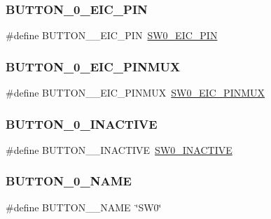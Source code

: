 \subsubsection{\texorpdfstring{BUTTON\_0\_EIC\_PIN}{BUTTON\_0\_EIC\_PIN}}
{\footnotesize\ttfamily \#define B\+U\+T\+T\+O\+N\+\_\+\_\+\+E\+I\+C\+\_\+\+P\+IN~\mbox{\hyperlink{group__samd21__xplained__pro__features__group_gac9d5ae203ecf805717134dfcee12372b}{S\+W0\+\_\+\+E\+I\+C\+\_\+\+P\+IN}}}

\mbox{\label{group__samd21__xplained__pro__features__group_gaca27ba0c8056196203f06d40cdeb7854}} 
\subsubsection{\texorpdfstring{BUTTON\_0\_EIC\_PINMUX}{BUTTON\_0\_EIC\_PINMUX}}
{\footnotesize\ttfamily \#define B\+U\+T\+T\+O\+N\+\_\+\_\+\+E\+I\+C\+\_\+\+P\+I\+N\+M\+UX~\mbox{\hyperlink{group__samd21__xplained__pro__features__group_ga27bc87cdd4caabcd3160ae3a03f297c7}{S\+W0\+\_\+\+E\+I\+C\+\_\+\+P\+I\+N\+M\+UX}}}

\mbox{\label{group__samd21__xplained__pro__features__group_ga54119bf75db09e383bfd9c3571fc4efe}} 
\subsubsection{\texorpdfstring{BUTTON\_0\_INACTIVE}{BUTTON\_0\_INACTIVE}}
{\footnotesize\ttfamily \#define B\+U\+T\+T\+O\+N\+\_\+\_\+\+I\+N\+A\+C\+T\+I\+VE~\mbox{\hyperlink{group__samd21__xplained__pro__features__group_ga74eeefc6abe579addaec6ac2bff4d080}{S\+W0\+\_\+\+I\+N\+A\+C\+T\+I\+VE}}}

\mbox{\label{group__samd21__xplained__pro__features__group_ga20c6ec898ac72b49ab8e52d034ad1e2b}} 
\subsubsection{\texorpdfstring{BUTTON\_0\_NAME}{BUTTON\_0\_NAME}}
{\footnotesize\ttfamily \#define B\+U\+T\+T\+O\+N\+\_\+\_\+\+N\+A\+ME~\char`\"{}S\+W0\char`\"{}}

